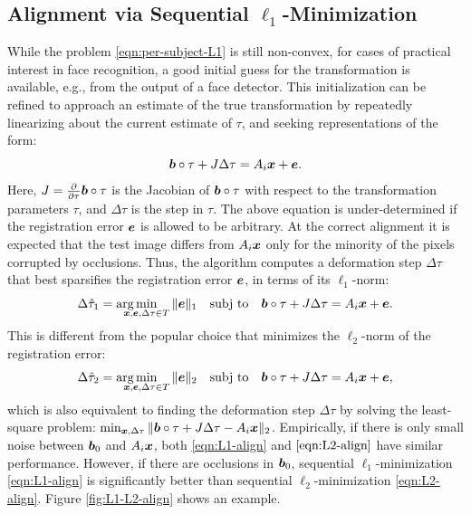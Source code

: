 \subsection{Alignment via Sequential $\ell_1$-Minimization} While the problem
\eqref{eqn:per-subject-L1} is still non-convex, for cases of practical interest
in face recognition, a good initial guess for the transformation is available,
e.g., from the output of a face detector. This initialization can be refined to
approach an estimate of the true transformation by repeatedly linearizing about  the
current estimate of $\tau$, and seeking representations of the form:
\begin{equation}
\boldsymbol{b}\circ \tau + J \Delta \tau = A_i {\boldsymbol{x}} + \boldsymbol{e}.
\end{equation}
Here, $J = \frac{\partial}{\partial \tau} \boldsymbol{b} \circ \tau$ is the Jacobian of $\boldsymbol{b}
\circ \tau$ with respect to the transformation parameters $\tau$, and $\Delta
\tau$ is the step in $\tau$. The above equation is under-determined if the
registration error $\boldsymbol{e}$ is allowed to be arbitrary. At the correct alignment it
is expected that the test image differs from $A_i {\boldsymbol{x}}$ only for the
minority of the pixels corrupted by occlusions. Thus, the algorithm computes a
deformation step $\Delta \tau$ that best sparsifies the registration error
$\boldsymbol{e}$, in terms of its $\ell_1$-norm:
\begin{equation}
\Delta\hat{\tau}_1 = \arg\hspace{-3.5mm}\min_{\x,\e,\Delta\tau \in T} \| \e \|_1 \quad \subj \quad \bb\circ\tau + J \Delta \tau = A_i \x + \e.
\label{eqn:L1-align}
\end{equation}
This is different from the popular choice that
minimizes the $\ell_2$-norm of the registration error:
\begin{equation}
\Delta\hat{\tau}_2 = \arg\hspace{-3.5mm}\min_{\x,\e,\Delta\tau \in T} \| \e \|_2 \quad \subj \quad \bb\circ\tau + J \Delta \tau = A_i \x + \e,
\label{eqn:L2-align}
\end{equation}
which is also equivalent to finding the deformation step
$\Delta  \tau$ by solving the least-square problem:
$\min_{{\boldsymbol{x}},\Delta \tau} \|\boldsymbol{b} \circ \tau + J\Delta \tau - A_i {\boldsymbol{x}}
\|_2$. Empirically, if there is only small noise
between $\boldsymbol{b}_0$ and $A_i{\boldsymbol{x}}$, both \eqref{eqn:L1-align} and
$\eqref{eqn:L2-align}$ have similar performance.  However, if
there are occlusions in $\boldsymbol{b}_0$, sequential
$\ell_1$-minimization \eqref{eqn:L1-align} is significantly
better than sequential $\ell_2$-minimization
\eqref{eqn:L2-align}. Figure \ref{fig:L1-L2-align} shows an
example.

